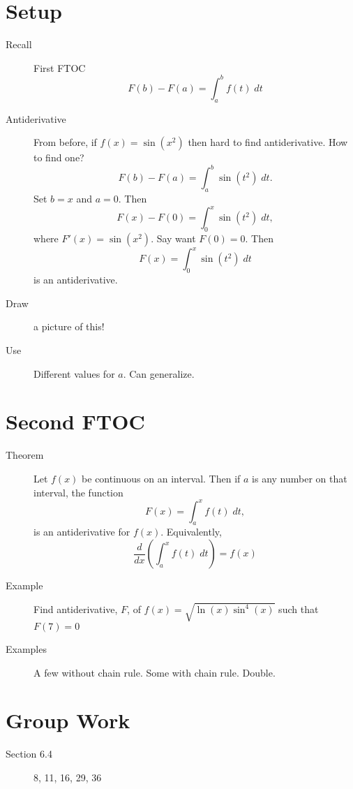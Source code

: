 \documentclass[11pt]{article}
\begin{document}
\drawtitle

\section*{Setup}
\begin{description}
\item[Recall] First FTOC
  \[
  F(b)-F(a)=\int_a^b f(t)\;dt
  \]
\item[Antiderivative] From before, if $f(x)=\sin(x^2)$ then hard to
  find antiderivative.  How to find one?
  \[
  F(b)-F(a)=\int_a^b \sin(t^2)\;dt.
  \]
  Set $b=x$ and $a=0$.  Then
  \[
  F(x)-F(0)=\int_0^x \sin(t^2)\;dt,
  \]
  where $F'(x)=\sin(x^2)$.  Say want $F(0)=0$.  Then
  \[
  F(x)=\int_0^x \sin(t^2)\;dt
  \]
  is an antiderivative.

  \item[Draw] a picture of this!
  \item[Use] Different values for $a$.  Can generalize.

\end{description}

\section*{Second FTOC}
\begin{description}
\item[Theorem] Let $f(x)$ be continuous on an interval.  Then if $a$
  is any number on that interval, the function
  \[
  F(x)=\int_a^x f(t)\;dt,
  \]
  is an antiderivative for $f(x)$.  Equivalently,
  \[
  \frac{d}{dx}\left(\int_a^x f(t)\;dt\right)=f(x)
  \]

\item[Example] Find antiderivative, $F$, of
  $f(x)=\sqrt{\ln(x)\sin^4(x)}$ such that $F(7)=0$

\item[Examples] A few without chain rule.  Some with chain rule.
  Double.


\end{description}

\section*{Group Work}
\begin{description}
\item[Section 6.4] 8, 11, 16, 29, 36
\end{description}
\end{document}
